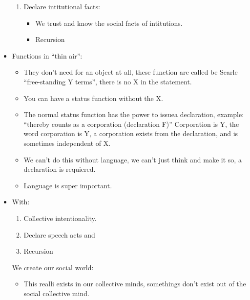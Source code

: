 \begin{itemize}
\begin{enumerate}
            \item Declare intitutional facts:
                \begin{itemize}
                    \item We trust and know the social facts of intitutions.
                    \item Recursion
                \end{itemize}
        \end{enumerate}
    
    \item Functions in ``thin air'':
        \begin{itemize}
            \item They don't need for an object at all, these function are called be Searle ``free-standing Y terms'', there is no X in the statement.
            \item You can have a status function without the X.
            \item The normal status function has the power to issuea declaration, example: ``thereby counts as a corporation (declaration F)'' Corporation is Y, the word corporation is Y, a corporation exists from the declaration, and is sometimes independent of X.
            \item We can't do this without language, we can't just think and make it so, a declaration is requiered.
            \item Language is super important.
        \end{itemize}
    
    \item With: 
        \begin{enumerate}
            \item Collective intentionality.
            \item Declare speech acts and
            \item Recursion 
        \end{enumerate}
        We create our social world:
        \begin{itemize}
            \item This realli exists in our collective minds, somethings don't exist out of the social collective mind.
        \end{itemize}
    

\end{itemize}

